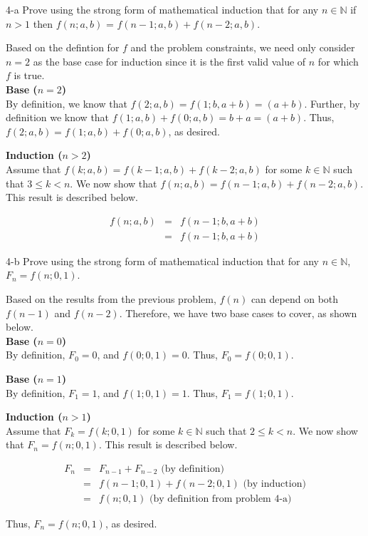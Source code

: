 \documentclass[11pt]{article}
\begin{document}
\begin{prob}{4-a}
Prove using the strong form of mathematical induction that for any $n \in \mathbb{N}$ if $n > 1$ then $f(n;a,b)$ = $f(n-1;a,b) + f(n-2;a,b)$.
\end{prob}
\begin{sol} 
Based on the defintion for $f$ and the problem constraints, we need only consider $n = 2$ as the base case for induction since it is the first valid value of $n$ for which $f$ is true. \\

\textbf{Base ($n = 2$)} \\
By definition, we know that $f(2;a,b) = f(1;b, a + b) = (a+b)$. Further, by definition we know that $f(1;a,b)+ f(0;a,b) = b + a = (a + b)$. Thus, $f(2;a,b) = f(1;a,b)+ f(0;a,b)$, as desired.

\textbf{Induction ($n > 2$)} \\
Assume that $f(k;a,b) = f(k-1;a,b)+ f(k-2;a,b)$ for some $k \in \mathbb{N}$ such that $3 \leq k < n$. We now show that $f(n;a,b) = f(n - 1;a,b)+ f(n - 2;a,b)$. This result is described below.

\begin{eqnarray*}
f(n;a,b) & = & f(n-1;b,a+b) \\
& = & f(n-1;b, a+b)
\end{eqnarray*}

\end{sol}

\begin{prob}{4-b}
Prove using the strong form of mathematical induction that for any $n \in \mathbb{N}$, $F_{n} = f(n;0,1)$.
\end{prob}
\begin{sol} 
Based on the results from the previous problem, $f(n)$ can depend on both $f(n-1)$ and $f(n-2)$. Therefore, we have two base cases to cover, as shown below. \\

\textbf{Base ($n = 0$)} \\
By definition, $F_{0} = 0$, and $f(0;0,1) = 0$. Thus, $F_{0} = f(0;0,1)$.

\textbf{Base ($n = 1$)} \\
By definition, $F_{1} = 1$, and $f(1;0,1) = 1$. Thus, $F_{1} = f(1;0,1)$.

\textbf{Induction ($n > 1$)} \\
Assume that $F_{k} = f(k;0,1)$ for some $k \in \mathbb{N}$ such that $2 \leq k < n$. We now show that $F_{n} = f(n;0,1)$. This result is described below.

\begin{eqnarray*}
F_{n} & = & F_{n - 1} + F_{n - 2} \text{ (by definition)} \\
& = & f(n - 1;0,1) + f(n-2;0,1) \text{ (by induction)} \\
& = & f(n;0,1) \text{ (by definition from problem 4-a)}
\end{eqnarray*}

Thus, $F_{n} = f(n;0,1)$, as desired.

\end{sol}
\end{document}
